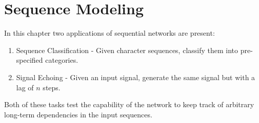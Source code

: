 \chapter{Sequence Modeling}
In this chapter two applications of sequential networks are present:
\begin{enumerate}
    \item Sequence Classification - Given character sequences, classify them into pre-specified categories.
    \item Signal Echoing - Given an input signal, generate the same signal but with a lag of $n$ steps.
\end{enumerate}
Both of these tasks test the capability of the network to keep track of arbitrary long-term dependencies in the input sequences.

